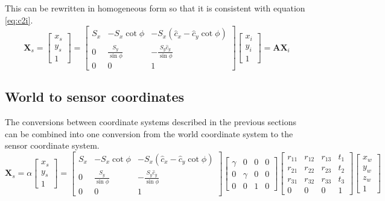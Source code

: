 This can be rewritten in homogeneous form so that it is consistent with equation \ref{eq:c2i}.
\begin{equation}
	\bm{X}_s = 
	\begin{bmatrix}
	x_s \\
	y_s \\
	1
	\end{bmatrix} =
	\begin{bmatrix}
	S_x & -S_x \cot \phi & -S_x \left( \hat c_x - \hat c_y \cot \phi \right) \\
	0 & \frac{S_y}{\sin \phi} & -\frac{S_y \hat c_y}{\sin \phi} \\
	0 & 0 & 1
	\end{bmatrix}
	\begin{bmatrix}
	x_i \\
	y_i \\
	1
	\end{bmatrix} =
	\bm{A} \bm{X}_i
\end{equation}

\subsection{World to sensor coordinates}
The conversions between coordinate systems described in the previous sections can be combined into one conversion from the world coordinate system to the sensor coordinate system.
\begin{equation}
	\bm{X}_s = \alpha
	\begin{bmatrix}
	x_s \\
	y_s \\
	1
	\end{bmatrix} =
	\begin{bmatrix}
	S_x & -S_x \cot \phi & -S_x \left( \hat c_x - \hat c_y \cot \phi \right) \\
	0 & \frac{S_y}{\sin \phi} & -\frac{S_y \hat c_y}{\sin \phi} \\
	0 & 0 & 1
	\end{bmatrix}
	\begin{bmatrix}
	\gamma & 0 & 0 & 0 \\
	0 & \gamma & 0 & 0 \\
	0 & 0 & 1 & 0
	\end{bmatrix}
	\begin{bmatrix}
	r_{11} & r_{12} & r_{13} & t_1 \\
	r_{21} & r_{22} & r_{23} & t_2 \\
	r_{31} & r_{32} & r_{33} & t_3 \\
	0 & 0 & 0 & 1
	\end{bmatrix}
	\begin{bmatrix}
	x_w \\
	y_w \\
	z_w \\
	1
	\end{bmatrix}
\end{equation}

